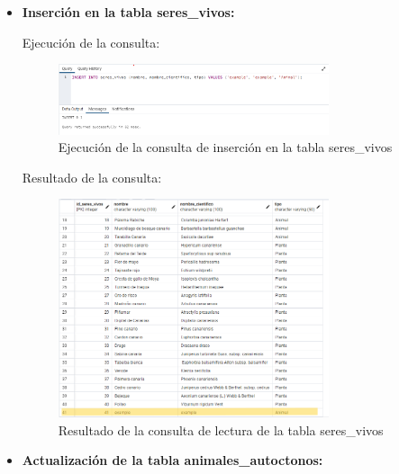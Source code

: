 \documentclass[11pt]{report}
\begin{document}
\begin{itemize}
      \item \textbf{Inserción en la tabla seres\_vivos:}
            \lstset{style=mystyle}
            

            Ejecución de la consulta:

            \begin{figure}[H]
                  \centering
                  \includegraphics[width=0.75\textwidth]{src/img/insert_seres_vivos.png}
                  \caption{Ejecución de la consulta de inserción en la tabla seres\_vivos}
                  \label{fig:create}
            \end{figure}

            Resultado de la consulta:

            \begin{figure}[H]
                  \centering
                  \includegraphics[width=0.75\textwidth]{src/img/tabla_seres__vivos.png}
                  \caption{Resultado de la consulta de lectura de la tabla seres\_vivos}
                  \label{fig:read_seres_vivos}
            \end{figure}

            \newpage

      \item \textbf{Actualización de la tabla animales\_autoctonos:}
            \lstset{style=mystyle}
            


\end{itemize}
\end{document}
